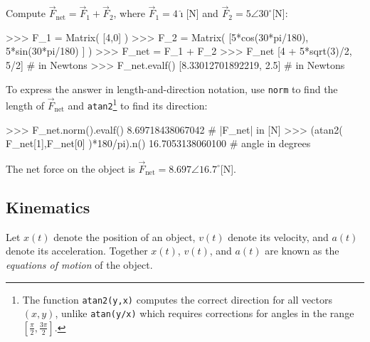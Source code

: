 Compute $\vec{F}_{\textrm{net}}=\vec{F}_1 + \vec{F}_2$,
where $\vec{F}_1=4\hat{\imath}$[N] and $\vec{F}_2 = 5\angle 30^\circ$[N]:
\small
\begin{verbatimtab}
>>> F_1 =  Matrix( [4,0] ) 
>>> F_2 =  Matrix( [5*cos(30*pi/180), 5*sin(30*pi/180) ] )
>>> F_net = F_1 + F_2
>>> F_net 
[4 + 5*sqrt(3)/2,   5/2]          # in Newtons 
>>> F_net.evalf()
[8.33012701892219,  2.5]          # in Newtons 
\end{verbatimtab}
\normalsize

\noindent
To express the answer in length-and-direction notation,
use \texttt{norm} to find the length of $\vec{F}_{\textrm{net}}$
and \texttt{atan2}\footnote{The function \texttt{atan2(y,x)} computes the correct direction 
for all vectors $(x,y)$, unlike \texttt{atan(y/x)} which requires corrections for angles in the range $[\frac{\pi}{2}, \frac{3\pi}{2}]$.}
to find its direction:
\small
\begin{verbatimtab}
>>> F_net.norm().evalf()
8.69718438067042                  # |F_net| in [N] 
>>> (atan2( F_net[1],F_net[0] )*180/pi).n()
16.7053138060100                  # angle in degrees
\end{verbatimtab}
\normalsize
The net force on the object is $\vec{F}_{\textrm{net}}= 8.697\angle 16.7^\circ$[N].


\subsection{Kinematics}
\label{mechanics:kinematics}

Let $x(t)$ denote the position of an object,															
$v(t)$ denote its velocity,
and $a(t)$ denote its acceleration.
Together $x(t)$, $v(t)$, and $a(t)$ are known as the \emph{equations of motion} of the object.


